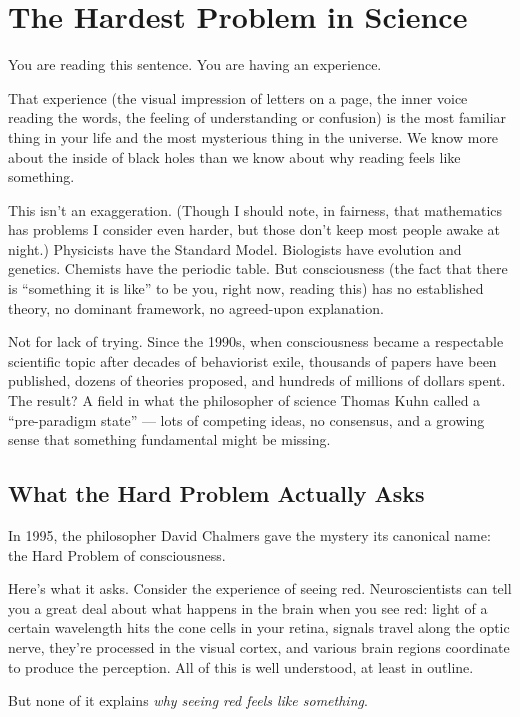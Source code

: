 \documentclass[11pt, twoside, openright]{book}
\begin{document}
\mainmatter
\pagestyle{fancy}
\chapter{The Hardest Problem in Science}

You are reading this sentence. You are having an experience.

That experience (the visual impression of letters on a page, the inner voice reading the words, the feeling of understanding or confusion) is the most familiar thing in your life and the most mysterious thing in the universe. We know more about the inside of black holes than we know about why reading feels like something.

This isn't an exaggeration. (Though I should note, in fairness, that mathematics has problems I consider even harder, but those don't keep most people awake at night.) Physicists have the Standard Model. Biologists have evolution and genetics. Chemists have the periodic table. But consciousness (the fact that there is ``something it is like'' to be you, right now, reading this) has no established theory, no dominant framework, no agreed-upon explanation.

Not for lack of trying. Since the 1990s, when consciousness became a respectable scientific topic after decades of behaviorist exile, thousands of papers have been published, dozens of theories proposed, and hundreds of millions of dollars spent. The result? A field in what the philosopher of science Thomas Kuhn called a ``pre-paradigm state'' --- lots of competing ideas, no consensus, and a growing sense that something fundamental might be missing.

\section*{What the Hard Problem Actually Asks}

In 1995, the philosopher David Chalmers gave the mystery its canonical name: the Hard Problem of consciousness.

Here's what it asks. Consider the experience of seeing red. Neuroscientists can tell you a great deal about what happens in the brain when you see red: light of a certain wavelength hits the cone cells in your retina, signals travel along the optic nerve, they're processed in the visual cortex, and various brain regions coordinate to produce the perception. All of this is well understood, at least in outline.

But none of it explains \textit{why seeing red feels like something}.
\end{document}
